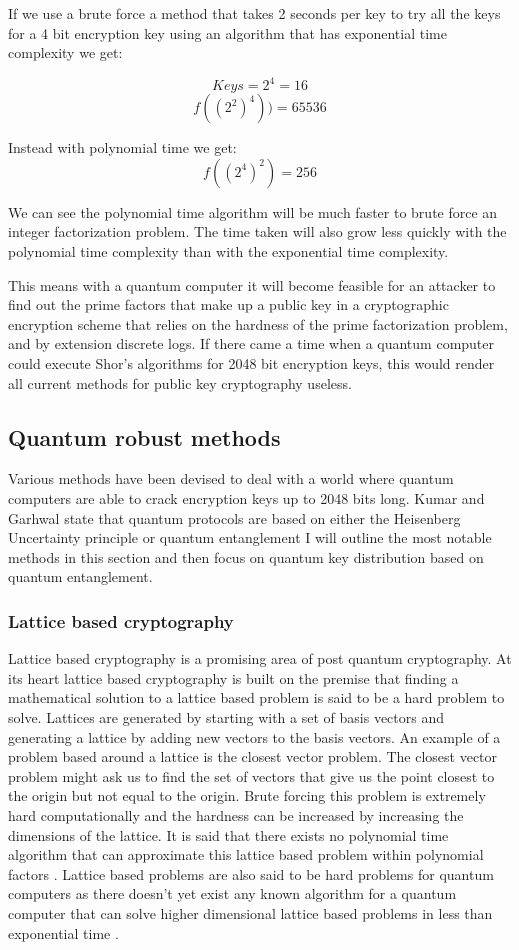 \documentclass{article}
\begin{document}
If we use a brute force a method that takes 2 seconds per key to try all the keys for a 4 bit encryption key using an algorithm that has exponential time complexity we get:

\[Keys = 2^4 = 16\]
\[f((2^2)^4)) = 65536\]


Instead with polynomial time we get:
\[f((2^4)^2) = 256\]

We can see the polynomial time algorithm will be much faster to brute force an integer factorization problem. The time taken will also grow less quickly with the polynomial time complexity than with the exponential time complexity.

This means with a quantum computer it will become feasible for an attacker to find out the prime factors that make up a public key in a cryptographic encryption scheme that relies on the hardness of the prime factorization problem, and by extension discrete logs. If there came a time when a quantum computer could execute Shor's algorithms for 2048 bit encryption keys, this would render all current methods for public key cryptography useless.

\subsection{Quantum robust methods}
Various methods have been devised to deal with a world where quantum computers are able to crack encryption keys up to 2048 bits long. Kumar and Garhwal state that quantum protocols are based on either the Heisenberg Uncertainty principle or quantum entanglement \cite{Kumar2021State-of-the-ArtCryptography} I will outline the most notable methods in this section and then focus on quantum key distribution based on quantum entanglement. 

\subsubsection{Lattice based cryptography}
Lattice based cryptography is a promising area of post quantum cryptography. At its heart lattice based cryptography is built on the premise that finding a mathematical solution to a lattice based problem is said to be a hard problem to solve. Lattices are generated by starting with a set of basis vectors and generating a lattice by adding new vectors to the basis vectors. An example of a problem based around a lattice is the closest vector problem. The closest vector problem might ask us to find the set of vectors that give us the point closest to the origin but not equal to the origin. Brute forcing this problem is extremely hard computationally and the hardness can be increased by increasing the dimensions of the lattice. It is said that there exists no polynomial time algorithm that can approximate this lattice based problem within polynomial factors \cite{Micciancio2008Lattice-based}. Lattice based problems are also said to be hard problems for quantum computers as there doesn't yet exist any known algorithm for a quantum computer that can solve higher dimensional lattice based problems in less than exponential time \cite{Micciancio2008Lattice-based}.
\end{document}
